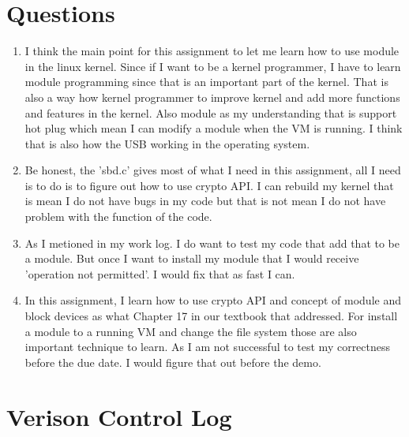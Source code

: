 \documentclass[letterpaper,11pt,titlepage]{article}
\begin{document}
\section{Questions}
\begin{enumerate}

\item I think the main point for this assignment to let me learn how to use module in the linux kernel. Since if I want to be a kernel programmer, I have to learn module programming since that is an important part of the kernel. That is also a way how kernel programmer to improve kernel and add more functions and features in the kernel.
Also module as my understanding that is support hot plug which mean I can modify a module when the VM is running. I think that is also how the USB working in the operating system.

\item Be honest, the 'sbd.c' gives most of what I need in this assignment, all I need is to do is to figure out how to use crypto API. I can rebuild my kernel that is mean I do not have bugs in my code but that is not mean I do not have problem with the function of the code.

\item As I metioned in my work log. I do want to test my code that add that to be a module. But once I want to install my module that I would receive 'operation not permitted'. I would fix that as fast I can.

\item In this assignment, I learn how to use crypto API and concept of module and block devices as what Chapter 17 in our textbook that addressed. For install a module to a running VM and change the file system those are also important technique to learn. As I am not successful to test my correctness before the due date. I would figure that out before the demo. 

\end{enumerate} 


\section{Verison Control Log}
\end{document}
